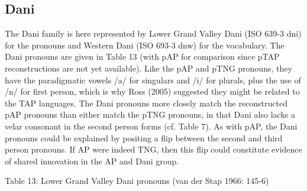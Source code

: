 \subsection[Dani]{Dani}
\hypertarget{RefHeading72084871885726}{}The Dani family is here represented by Lower Grand Valley Dani (ISO 639-3 dni) for the pronouns and Western Dani (ISO 693-3 dnw) for the vocabulary. The Dani pronouns are given in Table 13 (with pAP for comparison since pTAP reconstructions are not yet available). Like the pAP and pTNG pronouns, they have the paradigmatic vowels /a/ for singulars and /i/ for plurals, plus the use of /n/ for first person, which is why Ross (2005) suggested they might be related to the TAP languages. The Dani pronouns more closely match the reconstructed pAP pronouns than either match the pTNG pronouns, in that Dani also lacks a velar consonant in the second person forms (cf. Table 7). As with pAP, the Dani pronouns could be explained by positing a flip between the second and third person pronouns. If AP were indeed TNG, then this flip could constitute evidence of shared innovation in the AP and Dani group. 

{\centering
Table 13: Lower Grand Valley Dani pronouns (van der Stap 1966: 145-6)
\par}

